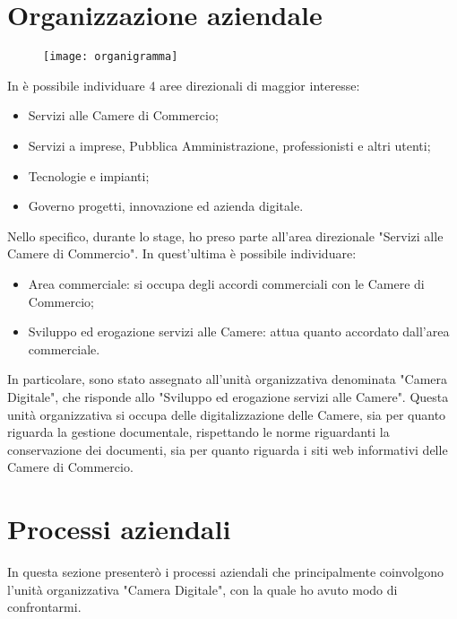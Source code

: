 \section{Organizzazione aziendale}
\label{sec:organizzazione_aziendale}

	\begin{figure}[htbp]
		\begin{center}
			\texttt{[image: organigramma]}
		\end{center}
	\end{figure}

	In \nomeAzienda è possibile individuare 4 aree direzionali di maggior interesse:
	\begin{itemize}
		\item{Servizi alle Camere di Commercio;}
		\item{Servizi a imprese, Pubblica Amministrazione, professionisti e altri utenti;}
		\item{Tecnologie e impianti;}
		\item{Governo progetti, innovazione ed azienda digitale.}
	\end{itemize}

	Nello specifico, durante lo stage, ho preso parte all'area direzionale "Servizi alle Camere di Commercio". In quest'ultima è possibile individuare:
	\begin{itemize}
		\item{Area commerciale: si occupa degli accordi commerciali con le Camere di Commercio;}
		\item{Sviluppo ed erogazione servizi alle Camere: attua quanto accordato dall'area commerciale.}
	\end{itemize}

	In particolare, sono stato assegnato all'unità organizzativa denominata "Camera Digitale", che risponde allo "Sviluppo ed erogazione servizi alle Camere". Questa unità organizzativa si occupa delle digitalizzazione delle Camere, sia per quanto riguarda la gestione documentale, rispettando le norme riguardanti la conservazione dei documenti, sia per quanto riguarda i siti web informativi delle Camere di Commercio.

\section{Processi aziendali}
\label{sec:processi_aziendali}
In questa sezione presenterò i processi aziendali che principalmente coinvolgono l'unità organizzativa "Camera Digitale", con la quale ho avuto modo di confrontarmi.

